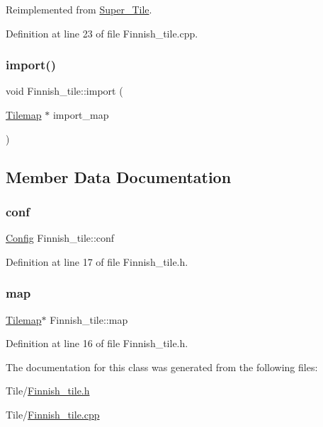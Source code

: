 Reimplemented from \hyperlink{class_super___tile_a7b509383d0d0ad2df0220f7dc4660823}{Super\+\_\+\+Tile}.



Definition at line 23 of file Finnish\+\_\+tile.\+cpp.

\hypertarget{class_finnish__tile_a6b20f4db90ec0522efcd766ec6bc0ab2}{}\label{class_finnish__tile_a6b20f4db90ec0522efcd766ec6bc0ab2} 
\subsubsection{\texorpdfstring{import()}{import()}}
{\footnotesize\ttfamily void Finnish\+\_\+tile\+::import (\begin{DoxyParamCaption}\item[{\hyperlink{class_tilemap}{Tilemap} $\ast$}]{import\+\_\+map }\end{DoxyParamCaption})}



\subsection{Member Data Documentation}
\hypertarget{class_finnish__tile_a29a7324c82ba5ca613dec5a346a5ebe0}{}\label{class_finnish__tile_a29a7324c82ba5ca613dec5a346a5ebe0} 
\subsubsection{\texorpdfstring{conf}{conf}}
{\footnotesize\ttfamily \hyperlink{class_config}{Config} Finnish\+\_\+tile\+::conf}



Definition at line 17 of file Finnish\+\_\+tile.\+h.

\hypertarget{class_finnish__tile_ae1bc1de931787b9cc0e4752b64518d94}{}\label{class_finnish__tile_ae1bc1de931787b9cc0e4752b64518d94} 
\subsubsection{\texorpdfstring{map}{map}}
{\footnotesize\ttfamily \hyperlink{class_tilemap}{Tilemap}$\ast$ Finnish\+\_\+tile\+::map}



Definition at line 16 of file Finnish\+\_\+tile.\+h.



The documentation for this class was generated from the following files\+:\begin{DoxyCompactItemize}
\item 
Tile/\hyperlink{_finnish__tile_8h}{Finnish\+\_\+tile.\+h}\item 
Tile/\hyperlink{_finnish__tile_8cpp}{Finnish\+\_\+tile.\+cpp}\end{DoxyCompactItemize}
